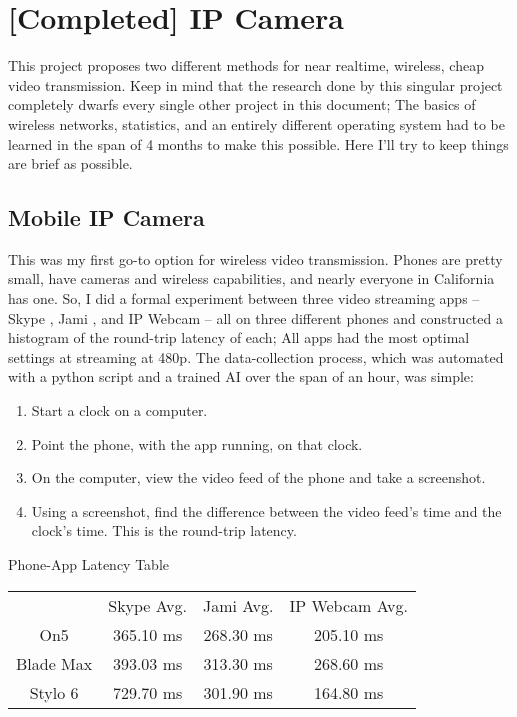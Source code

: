 \section{[Completed] IP Camera}

This project proposes two different methods for near realtime, wireless, cheap video transmission. Keep in mind that the research done by this singular project completely dwarfs every single other project in this document; The basics of wireless networks, statistics, and an entirely different operating system had to be learned in the span of 4 months to make this possible. Here I'll try to keep things are brief as possible.

\subsection{Mobile IP Camera}

This was my first go-to option for wireless video transmission. Phones are pretty small, have cameras and wireless capabilities, and nearly everyone in California has one. So, I did a formal experiment between three video streaming apps -- Skype \cite{Skype}, Jami \cite{Jami}, and IP Webcam \cite{IPWebcam} -- all on three different phones and constructed a histogram of the round-trip latency of each; All apps had the most optimal settings at streaming at 480p. The data-collection process, which was automated with a python script and a trained AI over the span of an hour, was simple:

\begin{enumerate}
\item{Start a clock on a computer.}
\item{Point the phone, with the app running, on that clock.}
\item{On the computer, view the video feed of the phone and take a screenshot.}
\item{Using a screenshot, find the difference between the video feed's time and the clock's time. This is the round-trip latency. }
\end{enumerate}

\begin{centering}
Phone-App Latency Table\\[0.5cm]

\begin{tabular}{c|c|c|c}
    & Skype Avg. & Jami Avg. & IP Webcam Avg. \\[0.5cm]
    On5 & 365.10 ms & 268.30 ms & 205.10 ms \\[0.5cm]
    Blade Max & 393.03 ms & 313.30 ms & 268.60 ms \\[0.5cm]
    Stylo 6 & 729.70 ms & 301.90 ms & 164.80 ms
\end{tabular} \newline

\end{centering}



